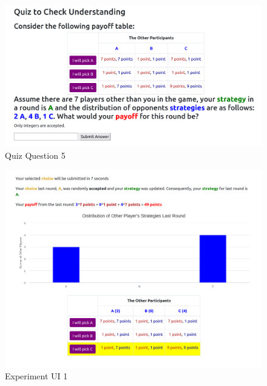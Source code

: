 \begin{figure}[h]
\captionsetup{justification=centering}
  \caption{Quiz Question 5}
   \label{fig:QuizQ5}
    \includegraphics[width = \textwidth]{Images/Q5.png}    
\end{figure}

\begin{figure}[h]
\captionsetup{justification=centering}
  \caption{Experiment UI 1}
   \label{fig:UI1}
    \includegraphics[width = \textwidth]{Images/Game1Choice.png}
\end{figure}

